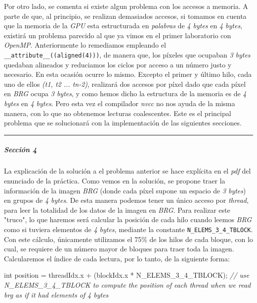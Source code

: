 \documentclass[
]{article}
\newenvironment{Shaded}{}{}
\newcommand{\CommentTok}[1]{\textcolor[rgb]{0.38,0.63,0.69}{\textit{#1}}}
\newcommand{\DataTypeTok}[1]{\textcolor[rgb]{0.56,0.13,0.00}{#1}}
\newcommand{\NormalTok}[1]{#1}
\newcommand{\OperatorTok}[1]{\textcolor[rgb]{0.40,0.40,0.40}{#1}}
\begin{document}
Por otro lado, se comenta si existe algun problema con los accesos a
memoria. A parte de que, al principio, se realizan demasiados accesos,
si tomamos en cuenta que la memoria de la \emph{GPU} esta estructurada
en \emph{palabras} de \emph{4 bytes} en \emph{4 bytes}, existirá un
problema parecido al que ya vimos en el primer laboratorio con
\emph{OpenMP}. Anteriormente lo remediamos empleando el
\texttt{\_\_attribute\_\_((aligned(4)))}, de manera que, los píxeles que
ocupaban \emph{3 bytes} quedaban alineados y reduciamos los ciclos por
acceso a un número justo y necesario. En esta ocasión ocurre lo mismo.
Excepto el primer y último hilo, cada uno de ellos \emph{(t1, t2 ...
tn-2)}, realizará dos accesos por píxel dado que cada píxel en
\emph{BRG} ocupa \emph{3 bytes}, y como hemos dicho la estructura de la
memoria es de \emph{4 bytes} en \emph{4 bytes}. Pero esta vez el
compilador \emph{nvcc} no nos ayuda de la misma manera, con lo que no
obtenemos lecturas coalescentes. Este es el principal problema que se
solucionará con la implementación de las siguientes secciones.

\begin{center}\rule{0.5\linewidth}{0.5pt}\end{center}

\hypertarget{secciuxf3n-4}{%
\subparagraph{Sección 4}\label{secciuxf3n-4}}

La explicación de la solución a el problema anterior se hace explícita
en el \emph{pdf} del enunciado de la práctica. Como vemos en la
solución, se propone traer la información de la imagen \emph{BRG} (donde
cada píxel supone un espacio de \emph{3 bytes}) en grupos de \emph{4
bytes}. De esta manera podemos tener un único acceso por \emph{thread},
para leer la totalidad de los datos de la imagen en \emph{BRG}. Para
realizar este "truco", lo que haremos será calcular la posición de cada
hilo cuando leemos \emph{BRG} como si tuviera elementos de \emph{4
bytes}, mediante la constante \texttt{N\_ELEMS\_3\_4\_TBLOCK}. Con este
cálculo, únicamente utilizamos el 75\% de los hilos de cada bloque, con
lo cual, se requiere de un número mayor de bloques para traer toda la
imagen. Calcularemos el índice de cada lectura, por lo tanto, de la
siguiente forma:

\begin{Shaded}
\begin{Highlighting}[]
\DataTypeTok{int}\NormalTok{ position }\OperatorTok{=}\NormalTok{ threadIdx}\OperatorTok{.}\NormalTok{x }\OperatorTok{+} \OperatorTok{(}\NormalTok{blockIdx}\OperatorTok{.}\NormalTok{x }\OperatorTok{*}\NormalTok{ N\_ELEMS\_3\_4\_TBLOCK}\OperatorTok{);} \CommentTok{// use N\_ELEMS\_3\_4\_TBLOCK to compute the position of each thread when we read brg as if it had elements of 4 bytes}
\end{Highlighting}
\end{Shaded}
\end{document}
